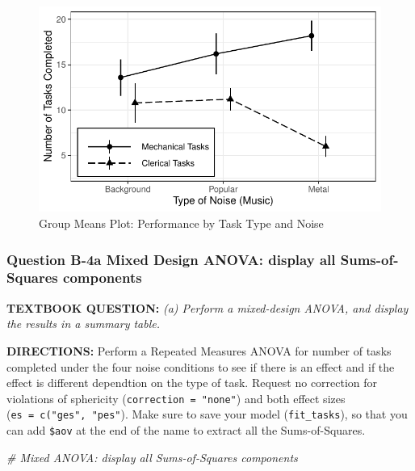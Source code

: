\documentclass[
]{article}
\newenvironment{Shaded}{\begin{snugshade}}{\end{snugshade}}
\newcommand{\CommentTok}[1]{\textcolor[rgb]{0.56,0.35,0.01}{\textit{#1}}}
\begin{document}
\begin{figure}

{\centering \includegraphics{Chapter-16-Assignment-R-Skeleton--2020spring-_files/figure-latex/unnamed-chunk-5-1} 

}

\caption{Group Means Plot: Performance by Task Type and Noise}\label{fig:unnamed-chunk-5}
\end{figure}

\clearpage

\hypertarget{question-b-4a-mixed-design-anova-display-all-sums-of-squares-components}{%
\subsubsection{Question B-4a Mixed Design ANOVA: display all
Sums-of-Squares
components}\label{question-b-4a-mixed-design-anova-display-all-sums-of-squares-components}}

\textbf{TEXTBOOK QUESTION:} \emph{(a) Perform a mixed-design ANOVA, and
display the results in a summary table.}

\textbf{DIRECTIONS:} Perform a Repeated Measures ANOVA for number of
tasks completed under the four noise conditions to see if there is an
effect and if the effect is different dependtion on the type of task.
Request no correction for violations of sphericity
(\texttt{correction\ =\ "none"}) and both effect sizes
(\texttt{es\ =\ c("ges",\ "pes"}). Make sure to save your model
(\texttt{fit\_tasks}), so that you can add \texttt{\$aov} at the end of
the name to extract all the Sums-of-Squares.

\begin{Shaded}
\begin{Highlighting}[]
\CommentTok{\# Mixed ANOVA: display all Sums{-}of{-}Squares components}
\end{Highlighting}
\end{Shaded}
\end{document}
